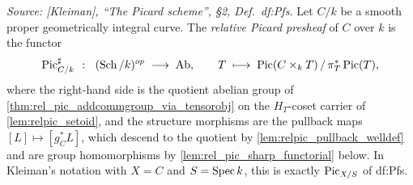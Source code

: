 \begin{definition}\leanok
  \label{def:rel_pic_sharp}

  \textit{Source: [Kleiman], ``The Picard scheme'', \S 2,
  Def.~df:Pfs.}
  Let \(C/k\) be a smooth proper geometrically integral curve. The
  \emph{relative Picard presheaf} of \(C\) over \(k\) is the functor
  \[
    \operatorname{Pic}^\sharp_{C/k} \;\;\colon\;\; (\operatorname{Sch}/k)^{op} \;\longrightarrow\; \mathrm{Ab},
    \qquad
    T \;\longmapsto\; \operatorname{Pic}(C \times_k T) \,/\, \pi_T^*\operatorname{Pic}(T),
  \]
  where the right-hand side is the quotient abelian group of
  \cref{thm:rel_pic_addcommgroup_via_tensorobj} on the \(H_T\)-coset
  carrier of \cref{lem:relpic_setoid}, and the structure morphisms are the
  pullback maps \([L] \mapsto [g_C^* L]\), which descend to the quotient by
  \cref{lem:relpic_pullback_welldef} and are group homomorphisms by
  \cref{lem:rel_pic_sharp_functorial} below. In Kleiman's notation with
  \(X = C\) and \(S = \operatorname{Spec} k\), this is exactly \(\operatorname{Pic}_{X/S}\) of df:Pfs.
\end{definition}


